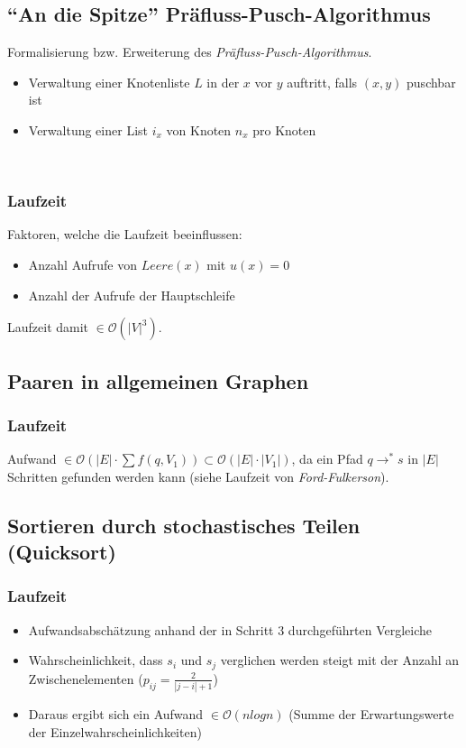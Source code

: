 \subsection{"`An die Spitze"' Präfluss-Pusch-Algorithmus}
Formalisierung bzw. Erweiterung des \textit{Präfluss-Pusch-Algorithmus}.
\begin{itemize}
	\item Verwaltung einer Knotenliste \(L\) in der \(x\) vor \(y\) auftritt, falls \((x,y)\) puschbar ist
	\item Verwaltung einer List \(i_x\) von Knoten \(n_x\) pro Knoten
\end{itemize}

\text{}\\


\subsubsection{Laufzeit}
Faktoren, welche die Laufzeit beeinflussen:
\begin{itemize}
	\item Anzahl Aufrufe von \(Leere(x)\) mit \(u(x) = 0\)
	\item Anzahl der Aufrufe der Hauptschleife
\end{itemize}
Laufzeit damit \(\in \mathcal{O}(|V|^3)\).



\subsection{Paaren in allgemeinen Graphen}


\subsubsection{Laufzeit}
Aufwand \(\in \mathcal{O}(|E|\cdot \sum f(q, V_1)) \subset \mathcal{O}(|E| \cdot |V_1|)\), da ein Pfad \(q \rightarrow^* s\) in \(|E|\) Schritten gefunden werden kann (siehe Laufzeit von \textit{Ford-Fulkerson}).


\subsection{Sortieren durch stochastisches Teilen (Quicksort)}


\subsubsection{Laufzeit}
\begin{itemize}
	\item Aufwandsabschätzung anhand der in Schritt 3 durchgeführten Vergleiche
	\item Wahrscheinlichkeit, dass \(s_i\) und \(s_j\) verglichen werden steigt mit der Anzahl an Zwischenelementen (\(p_{ij}=\frac{2}{|j-i|+1}\))
	\item Daraus ergibt sich ein Aufwand \(\in \mathcal{O}(nlogn)\) (Summe der Erwartungswerte der Einzelwahrscheinlichkeiten)
\end{itemize}


